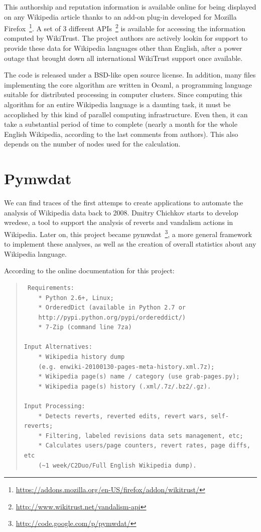 This authorship and reputation information is available online for being displayed
on any Wikipedia article thanks to an add-on plug-in developed for Mozilla 
Firefox~\footnote{\url{https://addons.mozilla.org/en-US/firefox/addon/wikitrust/}}.
A set of 3 different APIs~\footnote{\url{http://www.wikitrust.net/vandalism-api}} is
available for accessing the information computed by WikiTrust. The project authors
are actively lookin for support to provide these data for Wikipedia languages other
than English, after a power outage that brought down all international WikiTrust 
support once available.

The code is released under a BSD-like open source license. In addition, many
files implementing the core algorithm are written in Ocaml, a programming language
suitable for distributed processing in computer clusters. Since computing this algorithm
for an entire Wikipedia language is a daunting task, it must be accoplished by this
kind of parallel computing infrastructure. Even then, it can take a substantial
period of time to complete (nearly a month for the whole English Wikipedia, according
to the last comments from authors). This also depends on the number of nodes used
for the calculation.

\section{Pymwdat}
We can find traces of the first attemps to create applications to automate the 
analysis of Wikipedia data back to 2008. Dmitry Chichkov starts to develop wredese,
a tool to support the analysis of reverts and vandalism actions in Wikipedia. Later
on, this project became pymwdat~\footnote{\url{http://code.google.com/p/pymwdat/}},
a more general framework to implement these analyses, as well as the creation of
overall statistics about any Wikipedia language.

According to the online documentation for this project:

\begin{quotation}
\begin{verbatim}
 Requirements:
    * Python 2.6+, Linux;
    * OrderedDict (available in Python 2.7 or 
    http://pypi.python.org/pypi/ordereddict/)
    * 7-Zip (command line 7za)

Input Alternatives:
    * Wikipedia history dump 
    (e.g. enwiki-20100130-pages-meta-history.xml.7z);
    * Wikipedia page(s) name / category (use grab-pages.py);
    * Wikipedia page(s) history (.xml/.7z/.bz2/.gz).

Input Processing:
    * Detects reverts, reverted edits, revert wars, self-reverts;
    * Filtering, labeled revisions data sets management, etc;
    * Calculates users/page counters, revert rates, page diffs, etc 
    (~1 week/C2Duo/Full English Wikipedia dump).
\end{verbatim}

\end{quotation}


